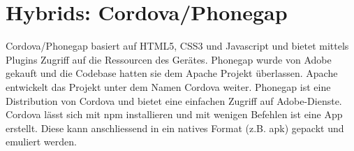 \section{Hybrids: Cordova/Phonegap}

Cordova/Phonegap basiert auf HTML5, CSS3 und Javascript und bietet mittels Plugins Zugriff auf die Ressourcen des Gerätes. Phonegap wurde von Adobe gekauft und die Codebase hatten sie dem Apache Projekt überlassen. Apache entwickelt das Projekt unter dem Namen Cordova weiter. Phonegap ist eine Distribution von Cordova und bietet eine einfachen Zugriff auf Adobe-Dienste. Cordova lässt sich mit npm installieren und mit wenigen Befehlen ist eine App erstellt. Diese kann anschliessend in ein natives Format (z.B. apk) gepackt und emuliert werden.